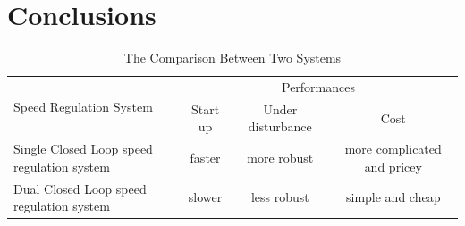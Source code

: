 \documentclass[11pt,english, openany]{book}
\begin{document}
\chapter{Conclusions}

\lipsum[2]


\begin{table}[b]
	\centering
	\small
	\begin{tabular}{lccc}
		\toprule
		\multirow{2}{*}{Speed Regulation System} & \multicolumn{3}{c}{Performances} \\ \cmidrule(lr){2-4}
		& Start up &  Under disturbance &  Cost \\
		\midrule
		Single Closed Loop speed regulation system  & faster & more robust & more complicated and pricey \\
		Dual Closed Loop speed regulation system & slower & less robust & simple and cheap \\
		\bottomrule
	\end{tabular}
	\caption{The Comparison Between Two Systems}
	\label{tab-label-1}
\end{table}

\lipsum[3-5]

\pagebreak




\vspace*{\fill}
{\hypersetup{urlcolor=black}{\footnotesize \doclicenseThis}}

\pagebreak

\end{document}
